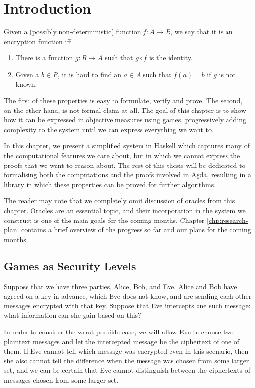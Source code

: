 \chapter{Introduction}

Given a (possibly non-deterministic) function $f : A \to B$, we say that it is an encryption function iff
\begin{enumerate}
    \itemsep0em
    \item There is a function $g : B \to A$ such that $g \circ f$ is the identity.
    \item Given a $b \in B$, it is hard to find an $a \in A$ such that $f(a) = b$ if $g$ is not known.
\end{enumerate}

The first of these properties is easy to formulate, verify and prove.  The second, on the other hand, is not formal
claim at all.  The goal of this chapter is to show how it can be expressed in objective measures using games,
progressively adding complexity to the system until we can express everything we want to.

In this chapter, we present a simplified system in Haskell which captures many of the computational features we care
about, but in which we cannot express the proofs that we want to reason about.  The rest of this thesis will be
dedicated to formalising both the computations and the proofs involved in Agda, resulting in a library in which these
properties can be proved for further algorithms.

The reader may note that we completely omit discussion of oracles from this chapter.  Oracles are an essential topic,
and their incorporation in the system we construct is one of the main goals for the coming months.  Chapter
\ref{chp:research-plan} contains a brief overview of the progress so far and our plans for the coming months.

\section{Games as Security Levels}

Suppose that we have three parties, Alice, Bob, and Eve.  Alice and Bob have agreed on a key in advance, which Eve does
not know, and are sending each other messages encrypted with that key.  Suppose that Eve intercepts one such message:
what information can she gain based on this?

In order to consider the worst possible case, we will allow Eve to choose two plaintext messages and let the intercepted
message be the ciphertext of one of them.  If Eve cannot tell which message was encrypted even in this scenario, then
she also cannot tell the difference when the message was chosen from some larger set, and we can be certain that Eve
cannot distinguish between the ciphertexts of messages chosen from some larger set.

